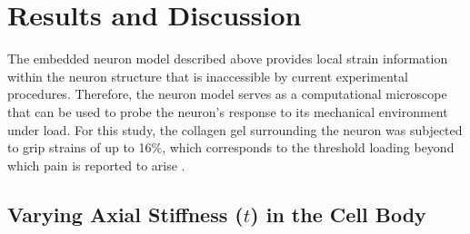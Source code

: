 \documentclass[]{interact}
\begin{document}
\section{Results and Discussion}
\label{sec:results}

The embedded neuron model described above provides local strain information within the neuron structure that is inaccessible by current experimental procedures. Therefore, the neuron model serves as a computational microscope that can be used to probe the  neuron's response to its mechanical environment under load. For this study, the collagen gel surrounding the neuron was subjected to grip strains of up to 16$\%$, which corresponds to the threshold loading beyond which pain is reported to arise \citep{Zhang:2016ga,Zhang:2017gr,Dong:2012bn,Lee:2004jl,Ita:Ys0ulxs9}. 

\subsection{Varying Axial Stiffness ($t$) in the Cell Body}
\label{sec:cellbody_stiffness}
\end{document}
